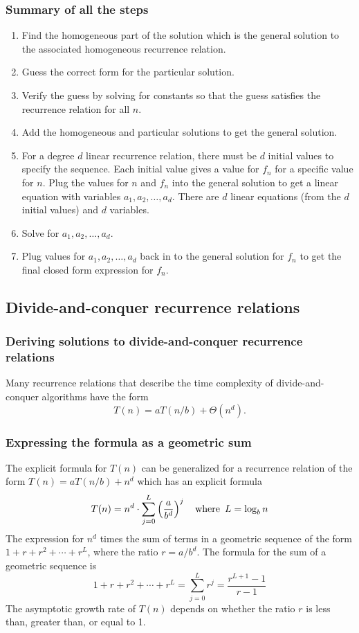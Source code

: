 \subsubsection*{Summary of all the steps}
\begin{enumerate}
  \item Find the homogeneous part of the solution which is the general solution to the associated homogeneous recurrence relation.
  \item Guess the correct form for the particular solution.
  \item Verify the guess by solving for constants so that the guess satisfies the recurrence relation for all $n$.
  \item Add the homogeneous and particular solutions to get the general solution.
  \item For a degree $d$ linear recurrence relation, there must be $d$ initial values to specify the sequence. Each initial value gives a value for $f_n$ for a specific value for $n$. Plug the values for $n$ and $f_n$ into the general solution to get a linear equation with variables $a_1,a_2,\ldots,a_d$. There are $d$ linear equations (from the $d$ initial values) and $d$ variables.
  \item Solve for $a_1,a_2,\ldots,a_d$.
  \item Plug values for $a_1,a_2,\ldots,a_d$ back in to the general solution for $f_n$ to get the final closed form expression for $f_n$.
\end{enumerate}

\subsection{Divide-and-conquer recurrence relations}
\subsubsection*{Deriving solutions to divide-and-conquer recurrence relations}
Many recurrence relations that describe the time complexity of divide-and-conquer algorithms have the form
\[
  T(n) = aT(n/b) + \Theta(n^d).
\]

\subsubsection*{Expressing the formula as a geometric sum}
The explicit formula for $T(n)$ can be generalized for a recurrence relation of the form $T(n) = aT(n/b) + n^d$ which has an explicit formula
\[
  T(n) = n^d \cdot \sum_{j=0}^{L}\left(\frac{a}{b^d}\right)^j~~\operatorname{~\text{where}~} L = \log_b n
\]
The expression for $n^d$ times the sum of terms in a geometric sequence of the form $1 + r + r^2 + \cdots + r^L$, where the ratio $r = a/b^d$. The formula for the sum of a geometric sequence is
\[
  1 + r + r^2 + \cdots + r^L = \sum_{j=0}^{L} r^j = \frac{r^{L+1}-1}{r-1}
\]
The asymptotic growth rate of $T(n)$ depends on whether the ratio $r$ is less than, greater than, or equal to 1.

